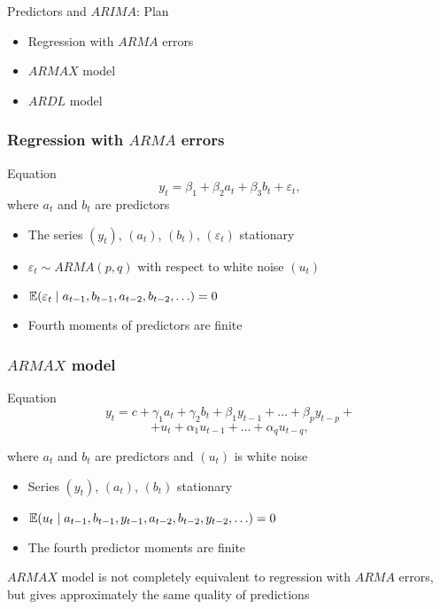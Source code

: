 
\begin{frame} %
	
	
\end{frame}

\begin{frame}{Predictors and $ARIMA$: Plan}
	\begin{itemize}[<+->]
		\item Regression with \alert{$ARMA$ errors}
		\item \alert{$ARMAX$ model}
		\item \alert{$ARDL$ model}
	\end{itemize}
\end{frame}

\begin{frame}
	\frametitle{Regression with $ARMA$ errors}
	
	\begin{block}{Equation}
		\[
		y_t = \beta_1 + \beta_2 a_t + \beta_3 b_t + \varepsilon_t,
		\]
		where $a_t$ and $b_t$ are \alert{predictors}
	\end{block}
	\pause
	\begin{itemize}[<+->]
		\item The series $(y_t)$, $(a_t)$, $(b_t)$, $(\varepsilon_t)$ \alert{stationary}
		\item $\varepsilon_t \sim ARMA(p, q)$ with respect to white noise $(u_t)$
		\item $\mathbb{E}(\varepsilon_t \mid a_{t-1}, b_{t-1}, a_{t-2}, b_{t-2}, \ldots) = 0$
		\item \alert{Fourth moments} of predictors are finite
	\end{itemize}
	
\end{frame}


\begin{frame}
	\frametitle{$ARMAX$ model}
	
	\begin{block}{Equation}
		\[
		y_t = c + \gamma_1 a_t + \gamma_2 b_t + \beta_1 y_{t-1} + \ldots + \beta_p y_{t-p} + 
		\]
				\[
		 + u_t + \alpha_1 u_{t-1} + \ldots + \alpha_q u_{t-q },
		\]
		
		where $a_t$ and $b_t$ are \alert{predictors} and $(u_t)$ is \alert{white noise}
	\end{block}
	\pause
	\begin{itemize}[<+->]
		\item Series $(y_t)$, $(a_t)$, $(b_t)$ \alert{stationary}
		\item $\mathbb{E}(u_t \mid a_{t-1}, b_{t-1}, y_{t-1}, a_{t-2}, b_{t-2}, y_{t-2} , \ldots) = 0$
		\item \alert{The fourth predictor moments} are finite
	\end{itemize}
	\pause
	$ARMAX$ model is not completely equivalent to regression with $ARMA$ errors, but gives \alert{approximately the same} quality of predictions
	
\end{frame}


